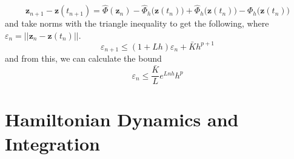 \documentclass{article}
\begin{document}
    \begin{equation}
      \mathbf{z}_{n+1} - \mathbf{z}(t_{n+1}) = \hat{\Phi}(\mathbf{z}_n) - \hat{\Phi}_h \big(\mathbf{z}(t_n)\big) + \hat{\Phi}_h \big(\mathbf{z}(t_n)\big) - \Phi_h \big(\mathbf{z}(t_n) \big)
    \end{equation}
    and take norms with the triangle inequality to get the following, where $\varepsilon_n = ||\mathbf{z}_n - \mathbf{z}(t_n)||$. 
    \begin{equation}
      \varepsilon_{n+1} \leq (1 + L h) \varepsilon_n + \bar{K} h^{p+1}
    \end{equation}
    and from this, we can calculate the bound 
    \begin{equation}
      \varepsilon_n \leq \frac{\bar{K}}{L} e^{L n h} h^p
    \end{equation}

\section{Hamiltonian Dynamics and Integration}
\end{document}
